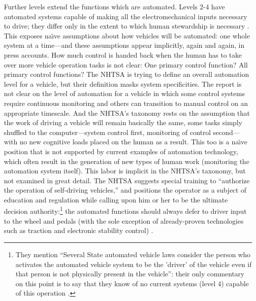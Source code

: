 Further levels extend the functions which are automated. Levels 2-4
have automated systems capable of making all the electromechanical
inputs necessary to drive; they differ only in the extent to which
human stewardship is necessary \cite[p. 4--5]{NHTSA}. This exposes na\"{\i}ve assumptions about
how vehicles will be automated:  one whole system at a time---and
these assumptions appear implicitly, again and again, in press
accounts. How much
control is handed back when the human has to take over more vehicle
operation tasks is not clear: One primary control function? All
primary control functions? The NHTSA is trying to define an overall
automation level for a vehicle, but their definition masks system
specificities. The report is not clear on the level of automation for
a vehicle in which some control systems require continuous monitoring
and others can transition to manual control on an appropriate
timescale. And the NHTSA's taxonomy rests on the assumption that the
work of driving a vehicle will remain basically the same, some tasks
simply shuffled to the computer---system control first, monitoring of
control second---with no new cognitive loads placed on the human as a
result. This too is a na\"{\i}ve position that is not supported by current
examples of automation technology, which often result in the
generation of new types of human work (monitoring the
automation system itself). This labor is implicit in the NHTSA's
taxonomy, but not examined in great detail. The NHTSA suggests special
training to ``authorize the operation of self-driving
vehicles,'' \cite[p. 11]{NHTSA} and
positions the operator as a subject of education and regulation while
calling upon him or her to be the ultimate decision
authority:\footnote{They mention ``Several State automated vehicle laws
consider the person who activates the automated vehicle system to be
the 'driver' of the vehicle even if that person is not physically
present in the vehicle'': their only commentary on this point is to say
that they know of no current systems (level 4) capable of this
operation \cite[p. 5]{NHTSA}.} the
automated functions should always defer to driver input to the wheel
and pedals (with the sole exception of already-proven technologies
such as traction and electronic stability control) \cite[p. 13]{NHTSA}.

